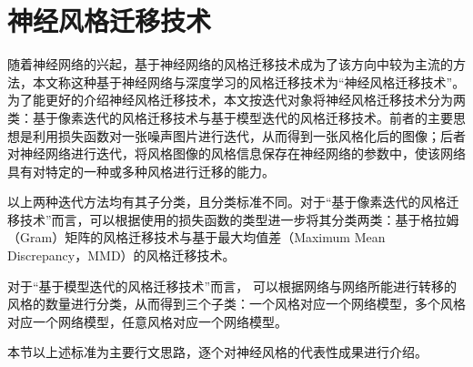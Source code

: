 \section{神经风格迁移技术}

随着神经网络的兴起，基于神经网络的风格迁移技术成为了该方向中较为主流的方法，本文称这种基于神经网络与深度学习的风格迁移技术为“神经风格迁移技术”。
为了能更好的介绍神经风格迁移技术，本文按迭代对象将神经风格迁移技术分为两类：基于像素迭代的风格迁移技术与基于模型迭代的风格迁移技术。前者的主要思想是利用损失函数对一张噪声图片进行迭代，从而得到一张风格化后的图像；后者对神经网络进行迭代，将风格图像的风格信息保存在神经网络的参数中，使该网络具有对特定的一种或多种风格进行迁移的能力。

以上两种迭代方法均有其子分类，且分类标准不同。对于“基于像素迭代的风格迁移技术”而言，可以根据使用的损失函数的类型进一步将其分类两类：基于格拉姆（Gram）矩阵的风格迁移技术与基于最大均值差（Maximum Mean Discrepancy，MMD）的风格迁移技术。%

对于“基于模型迭代的风格迁移技术”而言， 可以根据网络与网络所能进行转移的风格的数量进行分类，从而得到三个子类：一个风格对应一个网络模型，多个风格对应一个网络模型，任意风格对应一个网络模型。%

本节以上述标准为主要行文思路，逐个对神经风格的代表性成果进行介绍。
